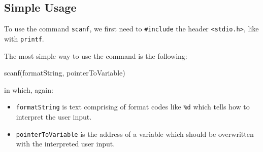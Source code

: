 \subsection{Simple Usage}
To use the command \texttt{scanf}, we first need to \texttt{\#include} the header \texttt{<stdio.h>}, like with \texttt{printf}.

The most simple way to use the command is the following:
\begin{codebox}
scanf(formatString, pointerToVariable)
\end{codebox}
in which, again:
\begin{itemize}
\setlength\itemsep{0pt}
\item \texttt{formatString} is text comprising of format codes like \texttt{\%d} which tells how to interpret the user input.
\item \texttt{pointerToVariable} is the address of a variable which should be overwritten with the interpreted user input.
\end{itemize}

